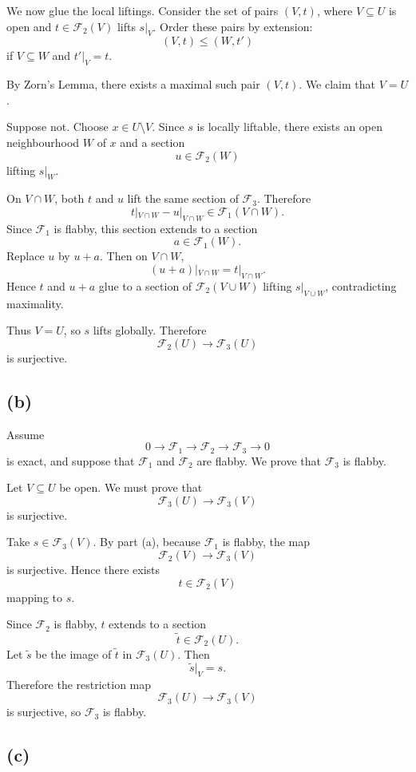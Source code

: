 \documentclass[12pt,a4paper]{article}
\theoremstyle{notespace}
\begin{document}
We now glue the local liftings. Consider the set of pairs $(V,t)$, where
$V\subseteq U$ is open and $t\in \mathcal F_2(V)$ lifts $s|_V$.
Order these pairs by extension:
\[
(V,t)\leq (W,t')
\]
if $V\subseteq W$ and $t'|_V=t$.

By Zorn's Lemma, there exists a maximal such pair $(V,t)$. We claim that
$V=U$.

Suppose not. Choose $x\in U\setminus V$. Since $s$ is locally liftable,
there exists an open neighbourhood $W$ of $x$ and a section
\[
u\in \mathcal F_2(W)
\]
lifting $s|_W$.

On $V\cap W$, both $t$ and $u$ lift the same section of $\mathcal F_3$.
Therefore
\[
t|_{V\cap W}-u|_{V\cap W}\in \mathcal F_1(V\cap W).
\]
Since $\mathcal F_1$ is flabby, this section extends to a section
\[
a\in \mathcal F_1(W).
\]
Replace $u$ by $u+a$. Then on $V\cap W$,
\[
(u+a)|_{V\cap W}=t|_{V\cap W}.
\]
Hence $t$ and $u+a$ glue to a section of $\mathcal F_2(V\cup W)$ lifting
$s|_{V\cup W}$, contradicting maximality.

Thus $V=U$, so $s$ lifts globally. Therefore
\[
\mathcal F_2(U)\longrightarrow \mathcal F_3(U)
\]
is surjective.

\subsection*{(b)}

Assume
\[
0 \longrightarrow \mathcal F_1
\longrightarrow \mathcal F_2
\longrightarrow \mathcal F_3
\longrightarrow 0
\]
is exact, and suppose that $\mathcal F_1$ and $\mathcal F_2$ are flabby.
We prove that $\mathcal F_3$ is flabby.

Let $V\subseteq U$ be open. We must prove that
\[
\mathcal F_3(U)\longrightarrow \mathcal F_3(V)
\]
is surjective.

Take $s\in \mathcal F_3(V)$. By part (a), because $\mathcal F_1$ is flabby,
the map
\[
\mathcal F_2(V)\longrightarrow \mathcal F_3(V)
\]
is surjective. Hence there exists
\[
t\in \mathcal F_2(V)
\]
mapping to $s$.

Since $\mathcal F_2$ is flabby, $t$ extends to a section
\[
\widetilde t\in \mathcal F_2(U).
\]
Let $\widetilde s$ be the image of $\widetilde t$ in $\mathcal F_3(U)$.
Then
\[
\widetilde s|_V=s.
\]
Therefore the restriction map
\[
\mathcal F_3(U)\longrightarrow \mathcal F_3(V)
\]
is surjective, so $\mathcal F_3$ is flabby.

\subsection*{(c)}
\end{document}
